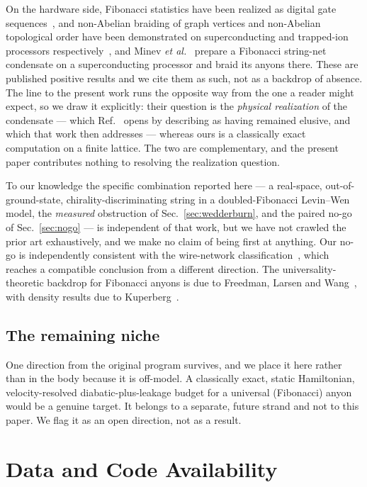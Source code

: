 \documentclass[aps,pra,twocolumn,superscriptaddress,longbibliography,floatfix,nofootinbib]{revtex4-2}
\begin{document}
On the hardware side, Fibonacci statistics have been realized as digital gate
sequences~\cite{Xu2024}, and non-Abelian braiding of graph vertices and
non-Abelian topological order have been demonstrated on superconducting and
trapped-ion processors respectively~\cite{Andersen2023,Iqbal2024}, and
Minev \emph{et al.}~\cite{Minev2025} prepare a Fibonacci string-net condensate
on a superconducting processor and braid its anyons there. These are published
positive results and we cite them as such, not as a backdrop of absence. The
line to the present work runs the opposite way from the one a reader might
expect, so we draw it explicitly: their question is the \emph{physical
realization} of the condensate --- which Ref.~\cite{Minev2025} opens by
describing as having remained elusive, and which that work then addresses ---
whereas ours is a classically exact computation on a finite lattice. The two are
complementary, and the present paper contributes nothing to resolving the
realization question.

To our knowledge the specific combination reported here --- a real-space,
out-of-ground-state, chirality-discriminating string in a doubled-Fibonacci
Levin--Wen model, the \emph{measured} obstruction of
Sec.~\ref{sec:wedderburn}, and the paired no-go of Sec.~\ref{sec:nogo} --- is
independent of that work, but we have not crawled the prior art exhaustively,
and we make no claim of being first at anything. Our no-go is independently
consistent with the wire-network
classification~\cite{ConlonSlingerland2022,Maciazek2023}, which reaches a
compatible conclusion from a different direction. The universality-theoretic
backdrop for Fibonacci anyons is due to Freedman, Larsen and
Wang~\cite{FLW2002}, with density results due to Kuperberg~\cite{Kuperberg2009}.

\subsection{The remaining niche}
\label{sec:niche}

One direction from the original program survives, and we place it here rather
than in the body because it is off-model. A classically exact, static
Hamiltonian, velocity-resolved diabatic-plus-leakage budget for a universal
(Fibonacci) anyon would be a genuine target. It belongs to a separate, future
strand and not to this paper. We flag it as an open direction, not as a
result.

\section*{Data and Code Availability}
\label{sec:data}
\end{document}
